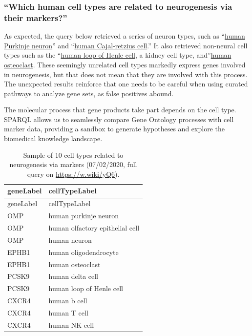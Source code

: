 \hypertarget{which-human-cell-types-are-related-to-neurogenesis-via-their-markers}{%
\subsubsection{``Which human cell types are related to neurogenesis via their markers?''}\label{which-human-cell-types-are-related-to-neurogenesis-via-their-markers}}

As expected, the query below retrieved a series of neuron types, such as ``\href{https://www.wikidata.org/wiki/Q101404913}{human Purkinje neuron}'' and ``\href{https://www.wikidata.org/wiki/Q101405091}{human Cajal-retzius cell}.'' It also retrieved non-neural cell types such as the ``\href{https://www.wikidata.org/wiki/Q101405109}{human loop of Henle cell}, a kidney cell type, and''\href{https://www.wikidata.org/wiki/Q101404928}{human osteoclast}.
These seemingly unrelated cell types markedly express genes involved in neurogenesis, but that does not mean that they are involved with this process.
The unexpected results reinforce that one needs to be careful when using curated pathways to analyze gene sets, as false positives abound.

The molecular process that gene products take part depends on the cell type.
SPARQL allows us to seamlessly compare Gene Ontology processes with cell marker data, providing a sandbox to generate hypotheses and explore the biomedical knowledge landscape.

\begin{longtable}[]{@{}ll@{}}
\caption{Sample of 10 cell types related to neurogenesis via markers (07/02/2020, full query on \url{https://w.wiki/yQ6}).
\label{tbl:neuro}}\tabularnewline
\toprule
geneLabel & cellTypeLabel \\
\midrule
\endfirsthead
\toprule
geneLabel & cellTypeLabel \\
\midrule
\endhead
OMP & human purkinje neuron \\
OMP & human olfactory epithelial cell \\
OMP & human neuron \\
EPHB1 & human oligodendrocyte \\
EPHB1 & human osteoclast \\
PCSK9 & human delta cell \\
PCSK9 & human loop of Henle cell \\
CXCR4 & human b cell \\
CXCR4 & human T cell \\
CXCR4 & human NK cell \\
\bottomrule
\end{longtable}

